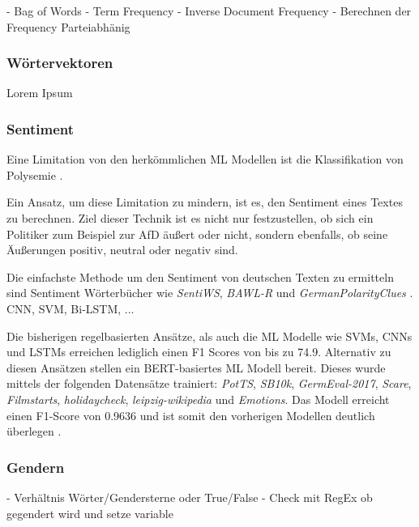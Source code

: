 - Bag of Words 
- Term Frequency - Inverse Document Frequency 
    - Berechnen der Frequency Parteiabhänig

\subsubsection{Wörtervektoren}

Lorem Ipsum

\subsubsection{Sentiment}

Eine Limitation von den herkömmlichen \ac{ML} Modellen ist die Klassifikation von Polysemie \autocite[48\psq]{kowsari_text_2019}. 


Ein Ansatz, um diese Limitation zu mindern, ist es, den Sentiment eines Textes zu berechnen. Ziel dieser Technik ist es nicht nur festzustellen, ob sich ein Politiker zum Beispiel zur \ac{AfD} äußert oder nicht, sondern ebenfalls, ob seine Äußerungen positiv, neutral oder negativ sind.


Die einfachste Methode um den Sentiment von deutschen Texten zu ermitteln sind Sentiment Wörterbücher wie \textit{SentiWS}, \textit{BAWL-R} und \textit{GermanPolarityClues} \autocite[1627\psq]{guhr_training_2020}. CNN, SVM, Bi-LSTM, ...

Die bisherigen regelbasierten Ansätze, als auch die \ac{ML} Modelle wie \acp{SVM}, \acp{CNN} und \acp{LSTM} erreichen lediglich einen F1 Scores von bis zu \num{74.9}. Alternativ zu diesen Ansätzen stellen \textcite{guhr_training_2020} ein \ac{BERT}-basiertes \ac{ML} Modell bereit. Dieses wurde mittels der folgenden Datensätze trainiert: \textit{PotTS}, \textit{SB10k}, \textit{GermEval-2017}, \textit{Scare}, \textit{Filmstarts}, \textit{holidaycheck}, \textit{leipzig-wikipedia} und \textit{Emotions}. Das Modell erreicht einen F1-Score von \num{0.9636} und ist somit den vorherigen Modellen deutlich überlegen \autocite[1631]{guhr_training_2020}.

\subsubsection{Gendern}

- Verhältnis Wörter/Gendersterne oder True/False
- Check mit RegEx ob gegendert wird und setze variable

